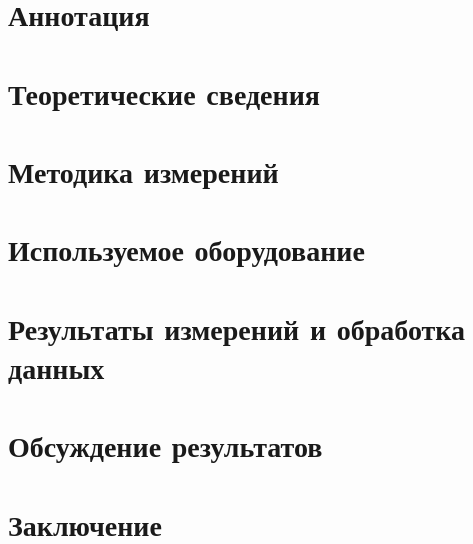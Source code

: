 \documentclass[1 pt]{article}
\begin{document}
\section{Аннотация}
\newpage
\section{Теоретические сведения}
\newpage
\section{Методика измерений}
\newpage
\section{Используемое оборудование}
\newpage
\section{Результаты измерений и обработка данных}
\newpage
\section{Обсуждение результатов}
\newpage
\section{Заключение}
\end{document}
